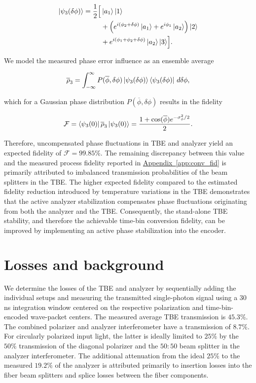 \documentclass[reprint, superscriptaddress, longbibliography, floatfix, twocolumn, nofootinbib, amsmath, amssymb, aps, showkeys]{revtex4-2}
\newcommand{\appref}[1]{\hyperref[#1]{Appendix~\ref*{#1}}}
\begin{document}
\begin{align}
\ket{\psi_3(\delta\phi)} = \frac{1}{2}\Bigl[
&\ket{a_1}\ket{1} \nonumber\\
&+\left(e^{i(\phi_2+\delta\phi)}\ket{a_1}
+e^{i\phi_1}\ket{a_2}\right)\ket{2} \nonumber\\
&+e^{i(\phi_1+\phi_2+\delta\phi)}\ket{a_2}\ket{3}
\Bigr].
\end{align}


We model the measured phase error influence as an ensemble average

\begin{align}
    \overline{\rho}_3=\int_{-\infty}^\infty P(\overline{\phi},\delta\phi)\ket{\psi_3(\delta\phi)}\bra{\psi_3(\delta\phi)}\,d\delta\phi,
\end{align}

which for a Gaussian phase distribution $P(\overline{\phi},\delta\phi)$ results in the fidelity

\begin{align}
  \mathcal{F}= \bra{\psi_3(0)}\overline{\rho}_3\ket{\psi_3(0)}=\frac{1+\cos(\overline{\phi})e^{-\sigma_\phi^2/2}}{2}.
\end{align}

Therefore, uncompensated phase fluctuations in TBE and analyzer yield an expected fidelity of $\mathcal{F}=99.85\%$. The remaining discrepancy between this value and the measured process fidelity reported in \appref{app:conv_fid} is primarily attributed to imbalanced transmission probabilities of the beam splitters in the TBE. The higher expected fidelity compared to the estimated fidelity reduction introduced by temperature variations in the TBE demonstrates that the active analyzer stabilization compensates phase fluctuations originating from both the analyzer and the TBE. Consequently, the stand-alone TBE stability, and therefore the achievable time-bin conversion fidelity, can be improved by implementing an active phase stabilization into the encoder.

\section{Losses and background}\label{app:losses} 

We determine the losses of the TBE and analyzer by sequentially adding the individual setups and measuring the transmitted single-photon signal using a $30\,$ns integration window centered on the respective polarization and time-bin-encoded wave-packet centers. The measured average TBE transmission is $45.3\%$. The combined polarizer and analyzer interferometer have a transmission of $8.7\%$. For circularly polarized input light, the latter is ideally limited to $25\%$ by the $50\%$ transmission of the diagonal polarizer and the $50{:}50$ beam splitter in the analyzer interferometer. The additional attenuation from the ideal $25\%$ to the measured $19.2\%$ of the analyzer is attributed primarily to insertion losses into the fiber beam splitters and splice losses between the fiber components.
\end{document}
